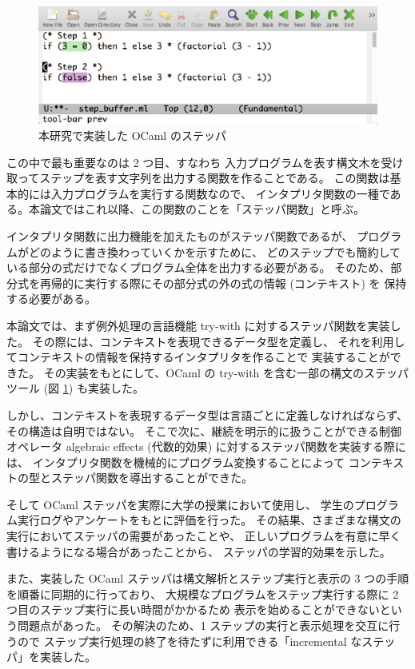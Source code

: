 \begin{figure}
\includegraphics[width=13cm]{1/ocamlfac.eps}
\caption{本研究で実装した OCaml のステッパ}
\label{figure:ocamlfac}
\end{figure}

この中で最も重要なのは 2 つ目、すなわち
入力プログラムを表す構文木を受け取ってステップを表す文字列を出力する関数を作ることである。
この関数は基本的には入力プログラムを実行する関数なので、
インタプリタ関数の一種である。本論文ではこれ以降、この関数のことを「ステッパ関数」と呼ぶ。

インタプリタ関数に出力機能を加えたものがステッパ関数であるが、
プログラムがどのように書き換わっていくかを示すために、
どのステップでも簡約している部分の式だけでなくプログラム全体を出力する必要がある。
そのため、部分式を再帰的に実行する際にその部分式の外の式の情報 (コンテキスト) を
保持する必要がある。

本論文では、まず例外処理の言語機能 try-with に対するステッパ関数を実装した。
その際には、コンテキストを表現できるデータ型を定義し、
それを利用してコンテキストの情報を保持するインタプリタを作ることで
実装することができた。
その実装をもとにして、OCaml の try-with を含む一部の構文のステッパツール
(図 \ref{figure:ocamlfac}) も実装した。

しかし、コンテキストを表現するデータ型は言語ごとに定義しなければならず、
その構造は自明ではない。
そこで次に、継続を明示的に扱うことができる制御オペレータ
algebraic effects (代数的効果) に対するステッパ関数を実装する際には、
インタプリタ関数を機械的にプログラム変換することによって
コンテキストの型とステッパ関数を導出することができた。

そして OCaml ステッパを実際に大学の授業において使用し、
学生のプログラム実行ログやアンケートをもとに評価を行った。
その結果、さまざまな構文の実行においてステッパの需要があったことや、
正しいプログラムを有意に早く書けるようになる場合があったことから、
ステッパの学習的効果を示した。

また、実装した OCaml ステッパは構文解析とステップ実行と表示の
3 つの手順を順番に同期的に行っており、
大規模なプログラムをステップ実行する際に 2 つ目のステップ実行に長い時間がかかるため
表示を始めることができないという問題点があった。
その解決のため、1 ステップの実行と表示処理を交互に行うので
ステップ実行処理の終了を待たずに利用できる「incremental なステッパ」を実装した。

